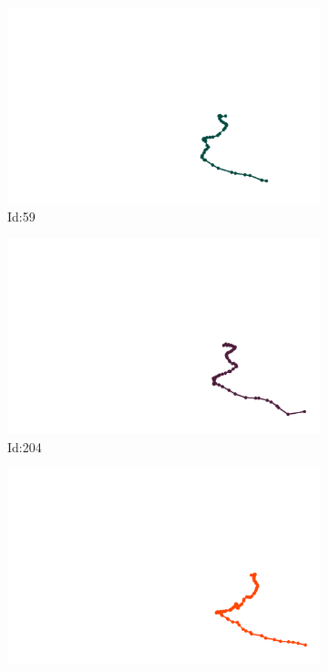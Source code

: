 \documentclass[12pt,twoside]{report}
\begin{document}
\begin{figure}
\centering
\begin{subfigure}[b]{0.20\textwidth}
\centering
\includegraphics[width=\textwidth]{../../trajectories/59.png}
\caption{Id:59}
\end{subfigure}
\begin{subfigure}[b]{0.20\textwidth}
\centering
\includegraphics[width=\textwidth]{../../trajectories/204.png}
\caption{Id:204}
\end{subfigure}
\begin{subfigure}[b]{0.20\textwidth}
\centering
\includegraphics[width=\textwidth]{../../trajectories/216.png}

\end{subfigure}
\end{figure}
\end{document}
